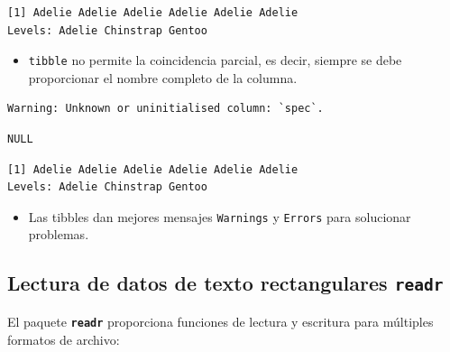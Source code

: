 \documentclass[
  letterpaper,
  DIV=11,
  numbers=noendperiod]{scrreprt}
\newenvironment{Shaded}{\begin{snugshade}}{\end{snugshade}}
\newcommand{\FunctionTok}[1]{\textcolor[rgb]{0.28,0.35,0.67}{#1}}
\newcommand{\NormalTok}[1]{\textcolor[rgb]{0.00,0.23,0.31}{#1}}
\newcommand{\SpecialCharTok}[1]{\textcolor[rgb]{0.37,0.37,0.37}{#1}}
\providecommand{\tightlist}{%
  \setlength{\itemsep}{0pt}\setlength{\parskip}{0pt}}\usepackage{longtable,booktabs,array}
\begin{document}
\begin{verbatim}
[1] Adelie Adelie Adelie Adelie Adelie Adelie
Levels: Adelie Chinstrap Gentoo
\end{verbatim}

\begin{itemize}
\tightlist
\item
  \texttt{tibble} no permite la coincidencia parcial, es decir, siempre
  se debe proporcionar el nombre completo de la columna.
\end{itemize}

\begin{Shaded}
\end{Shaded}

\begin{verbatim}
Warning: Unknown or uninitialised column: `spec`.
\end{verbatim}

\begin{verbatim}
NULL
\end{verbatim}

\begin{Shaded}
\end{Shaded}

\begin{verbatim}
[1] Adelie Adelie Adelie Adelie Adelie Adelie
Levels: Adelie Chinstrap Gentoo
\end{verbatim}

\begin{itemize}
\tightlist
\item
  Las tibbles dan mejores mensajes \texttt{Warnings} y \texttt{Errors}
  para solucionar problemas.
\end{itemize}

\subsection{\texorpdfstring{Lectura de datos de texto rectangulares
\texttt{readr}}{Lectura de datos de texto rectangulares readr}}\label{lectura-de-datos-de-texto-rectangulares-readr}

El paquete \textbf{\texttt{readr}} proporciona funciones de lectura y
escritura para múltiples formatos de archivo:
\end{document}
